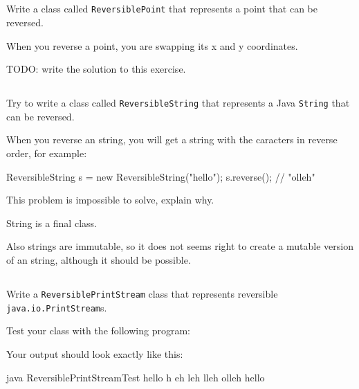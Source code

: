 \documentclass[a4paper, 11pt]{article}
\begin{document}
\subsection{}

Write a class called \texttt{ReversiblePoint} that represents a point that can
be reversed.

When you reverse a point, you are swapping its x and y coordinates.

\begin{solution}
TODO: write the solution to this exercise.
\end{solution}

\subsection{}

Try to write a class called \texttt{ReversibleString} that represents a Java
\texttt{String} that can be reversed.

When you reverse an string, you will get a string with the caracters in reverse
order, for example:

\begin{blackboard}
ReversibleString s = new ReversibleString("hello");
s.reverse(); // "olleh"
\end{blackboard}

This problem is impossible to solve, explain why.

\begin{solution}
String is a final class.

Also strings are immutable, so it does not seems right to create a mutable version
of an string, although it should be possible.
\end{solution}

\subsection{}

Write a \texttt{ReversiblePrintStream} class that represents reversible \texttt{java.io.PrintStream}s.

Test your class with the following program:


Your output should look exactly like this:

\begin{cmd}
 java ReversiblePrintStreamTest
 hello
 h
 eh
 leh
 lleh
 olleh
 hello
 \end{cmd}
\end{document}
